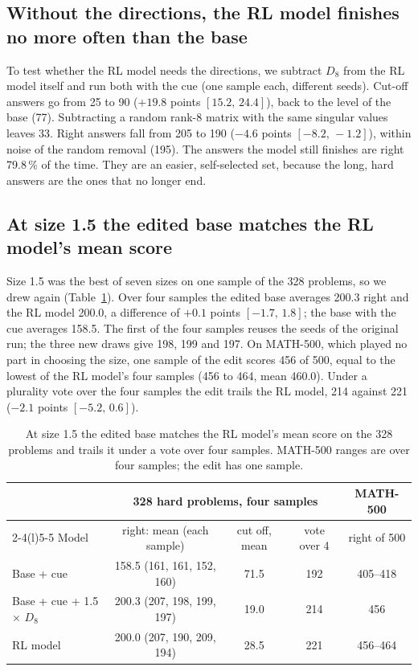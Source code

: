 \documentclass[10pt]{article}
\newcommand{\ci}[2]{$[#1,\,#2]$}
\newcommand{\x}{$\times$}
\begin{document}
\subsection{Without the directions, the RL model finishes no more often than the base}\label{sec:remove}

To test whether the RL model needs the directions, we subtract $D_8$ from the RL model itself and run both with
the cue (one sample each, different seeds). Cut-off answers go from 25 to 90 ($+19.8$ points \ci{15.2}{24.4}),
back to the level of the base (77). Subtracting a random rank-8 matrix with the same singular values leaves 33.
Right answers fall from 205 to 190 ($-4.6$ points \ci{-8.2}{-1.2}), within noise of the random removal (195). The
answers the model still finishes are right 79.8\,\% of the time. They are an easier, self-selected set, because
the long, hard answers are the ones that no longer end.

\subsection{At size 1.5 the edited base matches the RL model's mean score}\label{sec:match}

Size 1.5 was the best of seven sizes on one sample of the 328 problems, so we drew again (Table~\ref{tab:match}). Over four
samples the edited base averages 200.3 right and the RL model 200.0, a difference of $+0.1$ points
\ci{-1.7}{1.8}; the base with the cue averages 158.5. The first of the four samples reuses the seeds of the
original run; the three new draws give 198, 199 and 197. On MATH-500, which played no part in choosing the size,
one sample of the edit scores 456 of 500, equal to the lowest of the RL model's four samples (456 to 464, mean
460.0). Under a plurality vote over the four samples the edit trails the RL model, 214 against 221 ($-2.1$ points
\ci{-5.2}{0.6}).

\begin{table}[h]
\centering\small
\begin{tabular}{@{}lcccc@{}}
\toprule
 & \multicolumn{3}{c}{328 hard problems, four samples} & MATH-500 \\
\cmidrule(lr){2-4}\cmidrule(l){5-5}
Model & right: mean (each sample) & cut off, mean & vote over 4 & right of 500 \\
\midrule
Base + cue & 158.5 \;(161, 161, 152, 160) & 71.5 & 192 & 405--418 \\
Base + cue + 1.5 \x{} $D_8$ & 200.3 \;(207, 198, 199, 197) & 19.0 & 214 & 456 \\
RL model & 200.0 \;(207, 190, 209, 194) & 28.5 & 221 & 456--464 \\
\bottomrule
\end{tabular}
\caption{At size 1.5 the edited base matches the RL model's mean score on the 328 problems and trails it under
a vote over four samples. MATH-500 ranges are over four samples; the edit has one sample.}
\label{tab:match}
\end{table}
\end{document}
